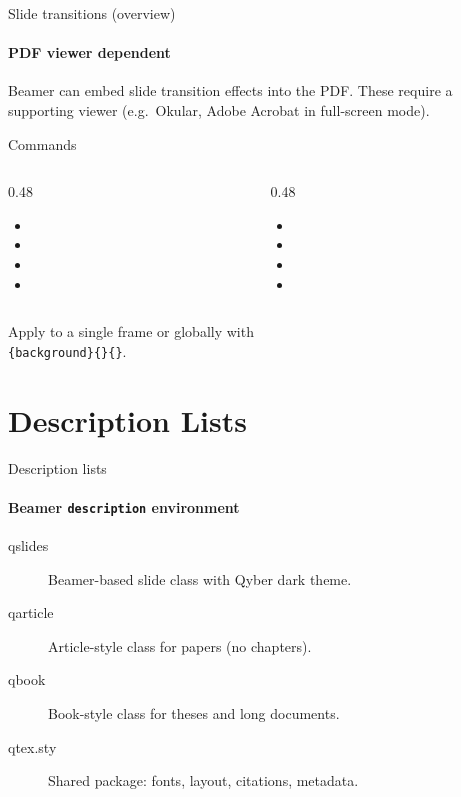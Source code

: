 \documentclass[sans,numeric,titlesplit]{qslides}
\begin{document}
\begin{frame}{Slide transitions (overview)}
  \framesubtitle{PDF viewer dependent}
  Beamer can embed slide transition effects into the PDF.  These require
  a supporting viewer (e.g.\ Okular, Adobe Acrobat in full-screen mode).
  \begin{block}{Commands}
    \small
    \begin{columns}[onlytextwidth,T]
      \begin{column}{0.48\linewidth}
        \begin{itemize}
          \item \texttt{\string\transdissolve}
          \item \texttt{\string\transblindshorizontal}
          \item \texttt{\string\transblindsvertical}
          \item \texttt{\string\transboxin}
        \end{itemize}
      \end{column}
      \begin{column}{0.48\linewidth}
        \begin{itemize}
          \item \texttt{\string\transboxout}
          \item \texttt{\string\transwipe}
          \item \texttt{\string\transcover}
          \item \texttt{\string\transfade}
        \end{itemize}
      \end{column}
    \end{columns}
  \end{block}
  Apply to a single frame or globally with\\
  {\small\texttt{\string\addtobeamertemplate\{background\}\{\string\transfade\}\{\}}}.
\end{frame}

\section{Description Lists}

\begin{frame}{Description lists}
  \framesubtitle{Beamer \texttt{description} environment}
  \begin{description}
    \item[qslides] Beamer-based slide class with Qyber dark theme.
    \item[qarticle] Article-style class for papers (no chapters).
    \item[qbook] Book-style class for theses and long documents.
    \item[qtex.sty] Shared package: fonts, layout, citations, metadata.
  \end{description}
\end{frame}
\end{document}

